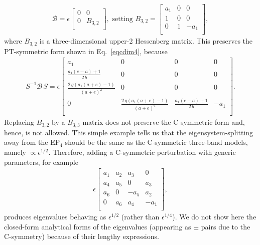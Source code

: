 \documentclass[aps, prb, onecolumn, nofootinbib, citeautoscript, 10pt]{revtex4-2}
\begin{document}
\begin{align}
\mathcal B = \epsilon \begin{bmatrix}
 0 & 0 \\
0  & B_{3,2}\\
\end{bmatrix}, \text{ setting }
B_{3,2} = \begin{bmatrix}
 a_1 & 0 & 0 \\
 1 & 0 & 0 \\
0 & 1 & -a_1 \\
 \end{bmatrix},
\end{align}
where $B_{3,2}$ is a three-dimensional upper-2 Hessenberg matrix.
This preserves the PT-symmetric form shown in Eq.~\eqref{eqcdim4}, because
\begin{align}
S^{-1} {\mathcal B} \,S = \epsilon \begin{bmatrix}
  a_1 & 0 & 0 & 0 \\
 \frac{a_1 (e-a)+1} {2\, b} & 0 & 0 & 0 \\
 \frac{2 \,g \left(a_1 (a+e)-1\right)}{(a+e)^2} & 0 & 0 & 0 \\
 0 & \frac{2 \,g \left(a_1 (a+e)-1\right)}{(a+e)^2} & \frac{a_1 (e-a)+1}{2 \,b} & -a_1 \\
 \end{bmatrix}.
\end{align}
Replacing $B_{3,2}$ by a $B_{3,3}$ matrix does not preserve the C-symmetric form and, hence, is not allowed. This simple example tells us that the eigensystem-splitting away from the EP$_4$ should be the same as the C-symmetric three-band models, namely $\propto \epsilon^{1/2}$.
Therefore, adding a C-symmetric perturbation with generic parameters, for example
\begin{align}
\epsilon \begin{bmatrix}
 a_1 & a_2 & a_3 & 0 \\
 a_4 & a_5 & 0 & a_3 \\
 a_6 & 0 & -a_5 & a_2 \\
 0 & a_6 & a_4 & -a_1 \\
\end{bmatrix},
\end{align}
produces eigenvalues behaving as $ \epsilon^{1/2} $ (rather than $\epsilon^{1/4}$). We do not show here the closed-form analytical forms of the eigenvalues (appearing as $\pm $ pairs due to the C-symmetry) because of their lengthy expressions.



\end{document}
